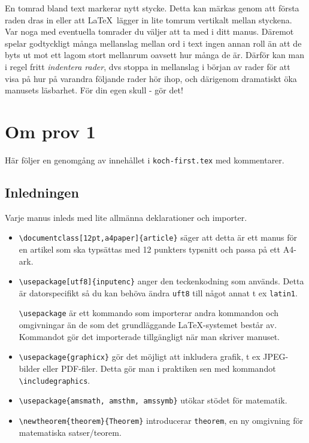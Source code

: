 \documentclass[a4paper,12pt]{article}
\begin{document}
En tomrad bland text markerar nytt stycke. Detta kan märkas genom att
första raden dras in eller att \LaTeX\ lägger in lite tomrum vertikalt
mellan styckena. Var noga med eventuella tomrader du väljer att ta med
i ditt manus. Däremot spelar godtyckligt många mellanslag mellan ord i
text ingen annan roll än att de byts ut mot ett lagom stort mellanrum
oavsett hur många de är. Därför kan man i regel fritt \emph{indentera
  rader}, dvs stoppa in mellanslag i början av rader för att visa på 
hur på varandra följande rader hör ihop, och därigenom dramatiskt öka
manusets läsbarhet. För din egen skull - gör det!
\begin{center}
  \noindent
\end{center}

\section{Om prov 1}

Här följer en genomgång av innehållet i \texttt{koch-first.tex} med 
kommentarer. 

\subsection{Inledningen}

Varje manus inleds med lite allmänna deklarationer och importer. 

\begin{itemize}
  \item \verb|\documentclass[12pt,a4paper]{article}| säger att detta
    är ett manus för en artikel som ska typsättas med 12 punkters 
    typsnitt och passa på ett A4-ark. 
  \item \verb|\usepackage[utf8]{inputenc}| anger den teckenkodning som
    används. Detta är datorspecifikt så du kan behöva ändra
    \texttt{uft8} till något annat t ex \texttt{latin1}.  

    \verb|\usepackage| är ett kommando som importerar andra kommandon
    och omgivningar än de som det grundläggande \LaTeX-systemet består
    av. Kommandot gör det importerade tillgängligt när man skriver
    manuset. 
  \item \verb|\usepackage{graphicx}| gör det möjligt att inkludera
    grafik, t ex JPEG-bilder eller PDF-filer. Detta gör man i
    praktiken sen med kommandot \verb|\includegraphics|. 
  \item \verb|\usepackage{amsmath, amsthm, amssymb}| utökar stödet för
    matematik. 
  \item \verb|\newtheorem{theorem}{Theorem}| introducerar
    \texttt{theorem}, en ny omgivning för matematiska satser/teorem.  
\end{itemize}
\end{document}
